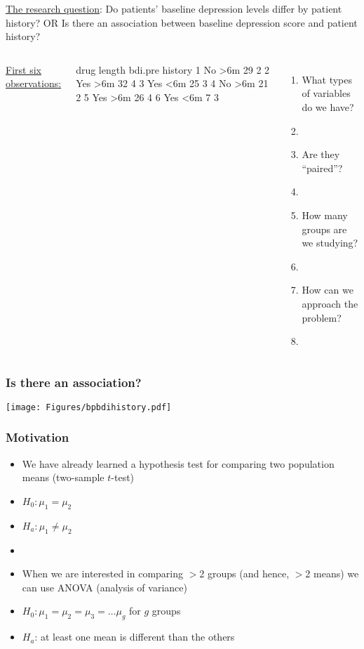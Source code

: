 \begin{frame}[fragile]
\underline{The research question}: Do patients' baseline depression levels differ by patient history? OR Is there an association between baseline depression score and patient history?
\vskip20pt
\begin{columns}
\underline{First six observations:}
\begin{lcverbatim}
  drug length bdi.pre history
1   No    >6m      29       2
2  Yes    >6m      32       4
3  Yes    <6m      25       3
4   No    >6m      21       2
5  Yes    >6m      26       4
6  Yes    <6m       7       3
\end{lcverbatim}
\begin{enumerate}
\item
What types of variables do we have?
\item[]
\item
Are they ``paired''?
\item[]
\item
How many groups are we studying?
\item[]
\item
How can we approach the problem?
\item[]
\end{enumerate}
\end{columns}
\end{frame}

\begin{frame}
\frametitle{Is there an association?}
\begin{center}
\texttt{[image: Figures/bpbdihistory.pdf]}
\end{center}
\end{frame}

\begin{frame}
\frametitle{Motivation}
\begin{itemize}
    \item
    We have already learned a hypothesis test for comparing two population means (two-sample $t$-test)
    \item[]
    $H_0: \mu_1=\mu_2$
    \item[]
    $H_a: \mu_1 \neq \mu_2$
    \item[]
    \item
    When we are interested in comparing $>$2 groups (and hence, $>$2 means) we can use ANOVA (analysis of variance)
    \item[]
    $H_0: \mu_1=\mu_2=\mu_3=\ldots \mu_g$ for $g$ groups
    \item[]
    $H_a$: at least one mean is different than the others
\end{itemize}
\end{frame}



